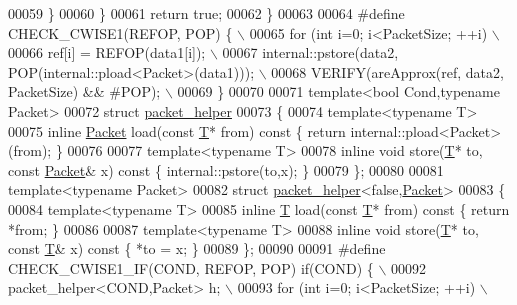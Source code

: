 \begin{DoxyCode}
00059     \}
00060   \}
00061   \textcolor{keywordflow}{return} \textcolor{keyword}{true};
00062 \}
00063 
00064 \textcolor{preprocessor}{#define CHECK\_CWISE1(REFOP, POP) \{ \(\backslash\)}
00065 \textcolor{preprocessor}{  for (int i=0; i<PacketSize; ++i) \(\backslash\)}
00066 \textcolor{preprocessor}{    ref[i] = REFOP(data1[i]); \(\backslash\)}
00067 \textcolor{preprocessor}{  internal::pstore(data2, POP(internal::pload<Packet>(data1))); \(\backslash\)}
00068 \textcolor{preprocessor}{  VERIFY(areApprox(ref, data2, PacketSize) && #POP); \(\backslash\)}
00069 \textcolor{preprocessor}{\}}
00070 
00071 \textcolor{keyword}{template}<\textcolor{keywordtype}{bool} Cond,\textcolor{keyword}{typename} Packet>
00072 \textcolor{keyword}{struct }\hyperlink{structpacket__helper}{packet\_helper}
00073 \{
00074   \textcolor{keyword}{template}<\textcolor{keyword}{typename} T>
00075   \textcolor{keyword}{inline} \hyperlink{group___sparse_core___module}{Packet} load(\textcolor{keyword}{const} \hyperlink{group___sparse_core___module}{T}* from)\textcolor{keyword}{ const }\{ \textcolor{keywordflow}{return} internal::pload<Packet>(from); \}
00076 
00077   \textcolor{keyword}{template}<\textcolor{keyword}{typename} T>
00078   \textcolor{keyword}{inline} \textcolor{keywordtype}{void} store(\hyperlink{group___sparse_core___module}{T}* to, \textcolor{keyword}{const} \hyperlink{group___sparse_core___module}{Packet}& x)\textcolor{keyword}{ const }\{ internal::pstore(to,x); \}
00079 \};
00080 
00081 \textcolor{keyword}{template}<\textcolor{keyword}{typename} Packet>
00082 \textcolor{keyword}{struct }\hyperlink{structpacket__helper}{packet\_helper}<false,\hyperlink{group___sparse_core___module}{Packet}>
00083 \{
00084   \textcolor{keyword}{template}<\textcolor{keyword}{typename} T>
00085   \textcolor{keyword}{inline} \hyperlink{group___sparse_core___module}{T} load(\textcolor{keyword}{const} \hyperlink{group___sparse_core___module}{T}* from)\textcolor{keyword}{ const }\{ \textcolor{keywordflow}{return} *from; \}
00086 
00087   \textcolor{keyword}{template}<\textcolor{keyword}{typename} T>
00088   \textcolor{keyword}{inline} \textcolor{keywordtype}{void} store(\hyperlink{group___sparse_core___module}{T}* to, \textcolor{keyword}{const} \hyperlink{group___sparse_core___module}{T}& x)\textcolor{keyword}{ const }\{ *to = x; \}
00089 \};
00090 
00091 \textcolor{preprocessor}{#define CHECK\_CWISE1\_IF(COND, REFOP, POP) if(COND) \{ \(\backslash\)}
00092 \textcolor{preprocessor}{  packet\_helper<COND,Packet> h; \(\backslash\)}
00093 \textcolor{preprocessor}{  for (int i=0; i<PacketSize; ++i) \(\backslash\)}

\end{DoxyCode}
